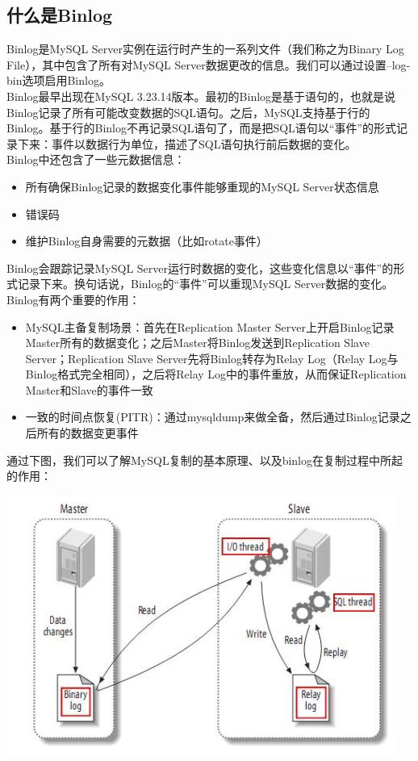 \documentclass[a4paper, titlepage, 10pt, bookmark]{article}
\begin{document}
\subsection{什么是Binlog}
Binlog是MySQL Server实例在运行时产生的一系列文件（我们称之为Binary Log File），其中包含了所有对MySQL Server数据更改的信息。我们可以通过设置--log-bin选项启用Binlog。\\

Binlog最早出现在MySQL 3.23.14版本。最初的Binlog是基于语句的，也就是说Binlog记录了所有可能改变数据的SQL语句。之后，MySQL支持基于行的Binlog。基于行的Binlog不再记录SQL语句了，而是把SQL语句以“事件”的形式记录下来：事件以数据行为单位，描述了SQL语句执行前后数据的变化。\\

Binlog中还包含了一些元数据信息：
\begin{itemize}
    \item 所有确保Binlog记录的数据变化事件能够重现的MySQL Server状态信息
    \item 错误码
    \item 维护Binlog自身需要的元数据（比如rotate事件）
\end{itemize}

Binlog会跟踪记录MySQL Server运行时数据的变化，这些变化信息以“事件”的形式记录下来。换句话说，Binlog的“事件”可以重现MySQL Server数据的变化。\\

Binlog有两个重要的作用：
\begin{itemize}
    \item MySQL主备复制场景：首先在Replication Master Server上开启Binlog记录Master所有的数据变化；之后Master将Binlog发送到Replication Slave Server；Replication Slave Server先将Binlog转存为Relay Log（Relay Log与Binlog格式完全相同），之后将Relay Log中的事件重放，从而保证Replication Master和Slave的事件一致
    \item 一致的时间点恢复(PITR)：通过mysqldump来做全备，然后通过Binlog记录之后所有的数据变更事件
\end{itemize}

通过下图，我们可以了解MySQL复制的基本原理、以及binlog在复制过程中所起的作用：
\begin{center}
\includegraphics[width=5in]{019.png}
\end{center}
\end{document}
